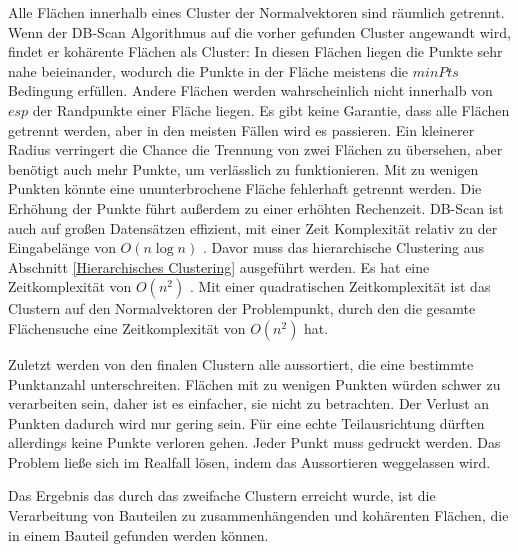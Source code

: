 \smallskip

Alle Flächen innerhalb eines Cluster der Normalvektoren sind räumlich getrennt. Wenn der DB-Scan Algorithmus auf die vorher gefunden Cluster angewandt wird, findet er kohärente Flächen als Cluster: In diesen Flächen liegen die Punkte sehr nahe beieinander, 
wodurch die Punkte in der Fläche meistens die $minPts$ Bedingung erfüllen. Andere Flächen werden wahrscheinlich nicht innerhalb von $esp$ der Randpunkte einer Fläche liegen. Es gibt keine Garantie, dass alle Flächen getrennt werden, 
aber in den meisten Fällen wird es passieren.
Ein kleinerer Radius verringert die Chance die Trennung von zwei Flächen zu übersehen, aber benötigt auch mehr Punkte, um verlässlich zu funktionieren. Mit zu wenigen Punkten könnte eine ununterbrochene Fläche fehlerhaft getrennt werden.
Die Erhöhung der Punkte führt außerdem zu einer erhöhten Rechenzeit. DB-Scan ist auch auf großen Datensätzen effizient, mit einer Zeit Komplexität relativ zu der Eingabelänge von $O(n \log n)$ \cite{gunawan2013faster}. 
Davor muss das hierarchische Clustering aus Abschnitt \ref{Hierarchisches Clustering} ausgeführt werden. Es hat eine Zeitkomplexität von $O(n^2)$ \cite{day1984efficient}. 
Mit einer quadratischen Zeitkomplexität ist das Clustern auf den Normalvektoren der Problempunkt, durch den die gesamte Flächensuche eine Zeitkomplexität von $O(n^2)$ hat.

\smallskip

Zuletzt werden von den finalen Clustern alle aussortiert, die eine bestimmte Punktanzahl unterschreiten. Flächen mit zu wenigen Punkten würden schwer zu verarbeiten sein, daher ist es einfacher, sie nicht zu betrachten. 
Der Verlust an Punkten dadurch wird nur gering sein. Für eine echte Teilausrichtung dürften allerdings keine Punkte verloren gehen. Jeder Punkt muss gedruckt werden. Das Problem ließe sich im Realfall lösen, indem das Aussortieren weggelassen wird.

\smallskip

Das Ergebnis das durch das zweifache Clustern erreicht wurde, ist die Verarbeitung von Bauteilen zu zusammenhängenden und kohärenten Flächen, die in einem Bauteil gefunden werden können.